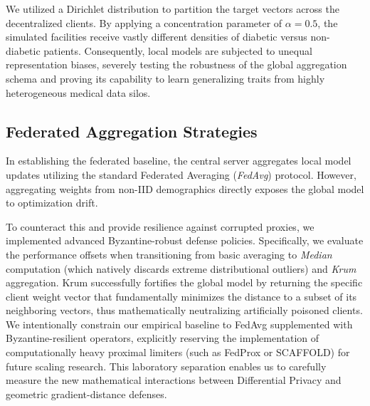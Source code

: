 \documentclass[conference]{IEEEtran}
\begin{document}
We utilized a Dirichlet distribution to partition the target vectors across the decentralized clients. By applying a concentration parameter of \( \alpha = 0.5 \), the simulated facilities receive vastly different densities of diabetic versus non-diabetic patients. Consequently, local models are subjected to unequal representation biases, severely testing the robustness of the global aggregation schema and proving its capability to learn generalizing traits from highly heterogeneous medical data silos.

\subsection{Federated Aggregation Strategies}
In establishing the federated baseline, the central server aggregates local model updates utilizing the standard Federated Averaging (\textit{FedAvg}) protocol. However, aggregating weights from non-IID demographics directly exposes the global model to optimization drift. 

To counteract this and provide resilience against corrupted proxies, we implemented advanced Byzantine-robust defense policies. Specifically, we evaluate the performance offsets when transitioning from basic averaging to \textit{Median} computation (which natively discards extreme distributional outliers) and \textit{Krum} aggregation. Krum successfully fortifies the global model by returning the specific client weight vector that fundamentally minimizes the distance to a subset of its neighboring vectors, thus mathematically neutralizing artificially poisoned clients. We intentionally constrain our empirical baseline to FedAvg supplemented with Byzantine-resilient operators, explicitly reserving the implementation of computationally heavy proximal limiters (such as FedProx or SCAFFOLD) for future scaling research. This laboratory separation enables us to carefully measure the new mathematical interactions between Differential Privacy and geometric gradient-distance defenses.
\end{document}
